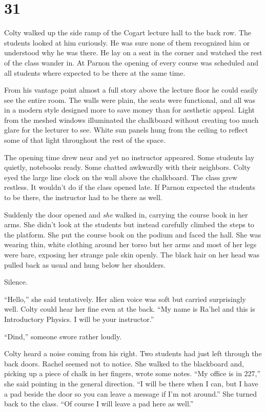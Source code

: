 
\chapter{31}

Colty walked up the side ramp of the Cogart lecture hall to the back row. The students looked at
him curiously. He was sure none of them recognized him or understood why he was there. He lay on
a seat in the corner and watched the rest of the class wander in. At Parnon the opening of every
course was scheduled and all students where expected to be there at the same time.

From his vantage point almost a full story above the lecture floor he could easily see the
entire room. The walls were plain, the seats were functional, and all was in a modern style
designed more to save money than for aesthetic appeal. Light from the meshed windows illuminated
the chalkboard without creating too much glare for the lecturer to see. White sun panels hung
from the ceiling to reflect some of that light throughout the rest of the space.

The opening time drew near and yet no instructor appeared. Some students lay quietly, notebooks
ready. Some chatted awkwardly with their neighbors. Colty eyed the large line clock on the wall
above the chalkboard. The class grew restless. It wouldn't do if the class opened late. If
Parnon expected the students to be there, the instructor had to be there as well.

Suddenly the door opened and \emph{she} walked in, carrying the course book in her arms. She
didn't look at the students but instead carefully climbed the steps to the platform. She put the
course book on the podium and faced the hall. She was wearing thin, white clothing around her
torso but her arms and most of her legs were bare, exposing her strange pale skin openly. The
black hair on her head was pulled back as usual and hung below her shoulders.

Silence.

``Hello,'' she said tentatively. Her alien voice was soft but carried surprisingly well. Colty
could hear her fine even at the back. ``My name is Ra'hel and this is Introductory Physics. I
will be your instructor.''

``Dind,'' someone swore rather loudly.

Colty heard a noise coming from his right. Two students had just left through the back doors.
Rachel seemed not to notice. She walked to the blackboard and, picking up a piece of chalk in
her fingers, wrote some notes. ``My office is in 227,'' she said pointing in the general
direction. ``I will be there when I can, but I have a pad beside the door so you can leave a
message if I'm not around.'' She turned back to the class. ``Of course I will leave a pad here
as well.''

